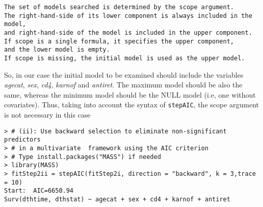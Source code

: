 \begin{enumerate}[(a)]
\begin{enumerate}[Step 1:]
\begin{enumerate}[(i)]
\begin{spacing}{1.2}
\begin{footnotesize}
\begin{verbatim}
The set of models searched is determined by the scope argument. 
The right-hand-side of its lower component is always included in the model, 
and right-hand-side of the model is included in the upper component. 
If scope is a single formula, it specifies the upper component, 
and the lower model is empty. 
If scope is missing, the initial model is used as the upper model.
\end{verbatim}
\end{footnotesize}
\end{spacing}
So, in our case the initial model to be examined should include the variables \emph{agecat}, \emph{sex}, \emph{cd4}, \emph{karnof} and \emph{antiret}. The maximum model should be also the same, whereas the minimum model should be the NULL model (i.e, one without covariates). Thus, taking into account the syntax of \verb|stepAIC|, the scope argument is not necessary in this case
\begin{spacing}{1.2}
\begin{footnotesize}
\begin{verbatim}
> # (ii): Use backward selection to eliminate non-significant predictors 
> # in a multivariate  framework using the AIC criterion
> # Type install.packages("MASS") if needed
> library(MASS)
> fitStep2ii = stepAIC(fitStep2i, direction = "backward", k = 3,trace = 10)
Start:  AIC=6650.94
Surv(dthtime, dthstat) ~ agecat + sex + cd4 + karnof + antiret


\end{verbatim}
\end{footnotesize}
\end{spacing}
\end{enumerate}
\end{enumerate}
\end{enumerate}
